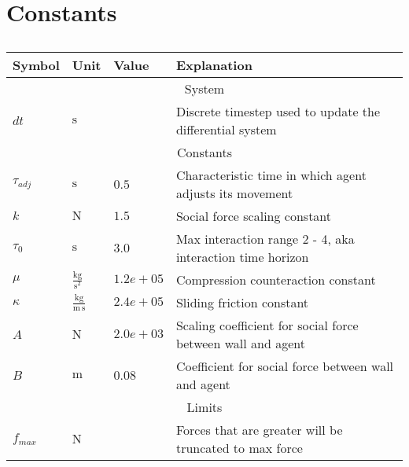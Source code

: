 \section{Constants}

\begin{table}[H]
\begin{tabular}{ llll }
\hline
Symbol         & Unit & Value & Explanation \\
\hline
\hline
\multicolumn{4}{c}{System} \\
\hline
$ dt $ & $ \mathrm{s} $ &  & Discrete timestep used to update the differential system \\
\hline
\multicolumn{4}{c}{Constants} \\
\hline
$ \tau_{adj} $ & $ \mathrm{s} $ & $ 0.5 $ & Characteristic time in which agent adjusts its movement \\
$ k $          & $ \mathrm{N} $ & $ 1.5 $ & Social force scaling constant \\
$ \tau_{0} $   & $ \mathrm{s} $ & $ 3.0 $ & Max interaction range 2 - 4, aka interaction time horizon \\
$ \mu $        & $ \mathrm{\frac{kg}{s^{2}}} $ & $ 1.2e+05 $ & Compression counteraction constant \\
$ \kappa $     & $ \mathrm{\frac{kg}{m\,s}} $ & $ 2.4e+05 $ & Sliding friction constant \\
$ A $          & $ \mathrm{N} $ & $ 2.0e+03 $ & Scaling coefficient for social force between wall and agent \\
$ B $          & $ \mathrm{m} $ & $ 0.08 $ & Coefficient for social force between wall and agent \\
\hline
\multicolumn{4}{c}{Limits} \\
\hline
$ f_{max} $    & $ \mathrm{N} $ &  & Forces that are greater will be truncated to max force \\
\hline
\end{tabular} 
\caption{}
\end{table}
